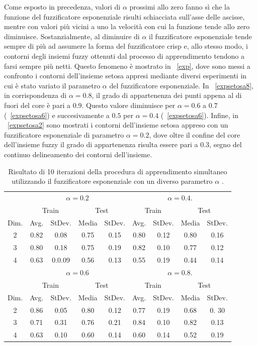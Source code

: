 \documentclass [11pt,a4paper,twoside,openright] {book}
\begin{document}
\noindent
Come esposto in precedenza, valori di $\alpha$ prossimi allo zero fanno sì che la funzione del  fuzzificatore esponenziale risulti schiacciata sull'asse delle ascisse, mentre con valori più vicini a uno la velocità con cui la funzione tende allo zero diminuisce. Sostanzialmente, al diminuire di $\alpha$ il fuzzificatore esponenziale tende sempre di più ad assumere la forma del fuzzificatore crisp e, allo stesso modo, i contorni degli insiemi fuzzy ottenuti dal processo di apprendimento tendono a farsi sempre più netti. Questo fenomeno è mostrato in \figurename~\ref{exp}, dove sono messi a confronto i contorni dell'insieme setosa appresi mediante diversi esperimenti in cui è stato variato il parametro $\alpha$ del fuzzificatore esponenziale. In \figurename~\ref{expsetosa8}, in corrispondenza di $\alpha=0.8$, il grado di appartenenza dei punti appena al di fuori del core è pari a $0.9$. Questo valore diminuisce per $\alpha=0.6$ a $0.7$ (\figurename~\ref{expsetosa6}) e succesivamente a $0.5$ per $\alpha=0.4$ (\figurename~\ref{expsetosa6}). Infine, in \figurename~\ref{expsetosa2} sono mostrati i contorni dell'insieme setosa appreso con un fuzzificatore esponenziale di parametro $\alpha=0.2$, dove oltre il confine del core dell'insieme fuzzy il grado di appartenenza risulta essere pari a $0.3$, segno del continuo delineamento dei contorni dell'insieme.
\begin{table}[H]
\caption{Risultato di 10 iterazioni della procedura di apprendimento simultaneo utilizzando il fuzzificatore esponenziale con un diverso parametro $\alpha$ \label{ef}.}
\begin{tabular}{|c|c|c|c|c|c|c|c|c|}
\hline
& \multicolumn{4}{|c|}{$\alpha=0.2$} & \multicolumn{4}{|c|}{$\alpha=0.4$.}\\
\cline{2-9}
& \multicolumn{2}{|c|}{Train} & \multicolumn{2}{|c|}{Test} & \multicolumn{2}{|c|}{Train} & \multicolumn{2}{|c|}{Test}\\
\hline
Dim. & Avg. & StDev. & Media & StDev. & Avg. & StDev. & Media & StDev. \\
\hline
2 & 0.82 & 0.08 & 0.75 & 0.15 & 0.80 & 0.12 & 0.80 & 0.16 \\
3 & 0.80 & 0.18 & 0.75 & 0.19 & 0.82 & 0.10 & 0.77 & 0.12 \\
4 & 0.63 & 0.0.09 & 0.56 & 0.13 & 0.55 & 0.19 & 0.44 & 0.14 \\
\hline
\hline
& \multicolumn{4}{|c|}{$\alpha=0.6$} & \multicolumn{4}{|c|}{$\alpha=0.8$.}\\
\cline{2-9}
& \multicolumn{2}{|c|}{Train} & \multicolumn{2}{|c|}{Test} & \multicolumn{2}{|c|}{Train} & \multicolumn{2}{|c|}{Test}\\
\hline
Dim. & Avg. & StDev. & Media & StDev. & Avg. & StDev. & Media & StDev. \\
\hline
2 & 0.86 & 0.05 & 0.80 & 0.12 & 0.77 & 0.19 & 0.68 & 0. 30\\
3 & 0.71 & 0.31 & 0.76 & 0.21 & 0.84 & 0.10 & 0.82 & 0.13 \\
4 & 0.63 & 0.10 & 0.60 & 0.14 & 0.60 & 0.14 & 0.52 & 0.19 \\
\hline
\end{tabular}
\end{table}
\end{document}
